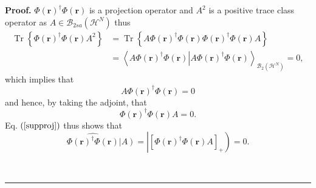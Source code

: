 \documentclass[aps,preprint]{revtex4}%
\newenvironment{proof}[1][Proof]{\noindent\textbf{#1.} }{\ \rule{0.5em}{0.5em}}
\begin{document}
\begin{proof}
$\Phi\left(  \boldsymbol{r}\right)  ^{\dagger}\Phi\left(  \boldsymbol{r}%
\right)  $ is a projection operator and $A^{2}$ is a positive trace class
operator as $A\in\mathcal{B}_{2sa}\left(  \mathcal{H}^{N}\right)  $ thus
\begin{align}
\operatorname*{Tr}\left\{  \Phi\left(  \boldsymbol{r}\right)  ^{\dagger}%
\Phi\left(  \boldsymbol{r}\right)  A^{2}\right\}   &  =\operatorname*{Tr}%
\left\{  A\Phi\left(  \boldsymbol{r}\right)  ^{\dagger}\Phi\left(
\boldsymbol{r}\right)  \Phi\left(  \boldsymbol{r}\right)  ^{\dagger}%
\Phi\left(  \boldsymbol{r}\right)  A\right\} \nonumber\\
&  =\left\langle A\Phi\left(  \boldsymbol{r}\right)  ^{\dagger}\Phi\left(
\boldsymbol{r}\right)  \left\vert A\Phi\left(  \boldsymbol{r}\right)
^{\dagger}\Phi\left(  \boldsymbol{r}\right)  \right.  \right\rangle
_{\mathcal{B}_{2}\left(  \mathcal{H}^{N}\right)  }=0,
\end{align}
which implies that
\begin{equation}
A\Phi\left(  \boldsymbol{r}\right)  ^{\dagger}\Phi\left(  \boldsymbol{r}%
\right)  =0
\end{equation}
and hence, by taking the adjoint, that
\begin{equation}
\Phi\left(  \boldsymbol{r}\right)  ^{\dagger}\Phi\left(  \boldsymbol{r}%
\right)  A=0.
\end{equation}
Eq. $\left(  \ref{supproj}\right)  $ thus shows that
\begin{equation}
\widehat{\Phi\left(  \boldsymbol{r}\right)  ^{\dagger}\Phi\left(
\boldsymbol{r}\right)  }\left\vert A\right)  =\left\vert \left[  \Phi\left(
\boldsymbol{r}\right)  ^{\dagger}\Phi\left(  \boldsymbol{r}\right)  A\right]
_{+}\right)  =0.
\end{equation}

\end{proof}
\end{document}

